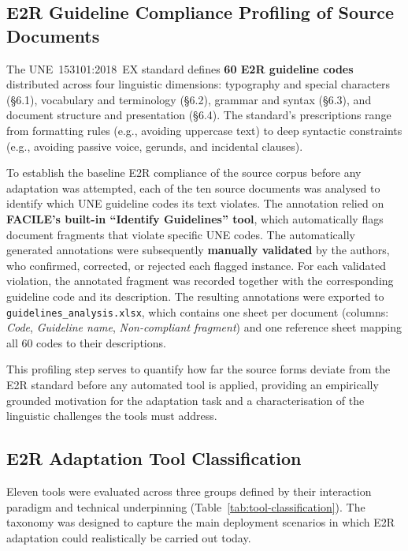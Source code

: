 \documentclass[12pt, a4paper]{article}
\begin{document}
\subsection{E2R Guideline Compliance Profiling of Source Documents}
\label{ssec:profiling}

The UNE~153101:2018~EX standard defines \textbf{60 E2R guideline codes} distributed
across four linguistic dimensions: typography and special characters (\S6.1), vocabulary
and terminology (\S6.2), grammar and syntax (\S6.3), and document structure and
presentation (\S6.4). The standard's prescriptions range from formatting rules (e.g.,
avoiding uppercase text) to deep syntactic constraints (e.g., avoiding passive voice,
gerunds, and incidental clauses).

To establish the baseline E2R compliance of the source corpus before any adaptation was
attempted, each of the ten source documents was analysed to identify which UNE guideline
codes its text violates. The annotation relied on \textbf{FACILE's built-in
``Identify Guidelines'' tool}, which automatically flags document fragments that violate
specific UNE codes. The automatically generated annotations were subsequently
\textbf{manually validated} by the authors, who confirmed, corrected, or rejected each
flagged instance. For each validated violation, the annotated fragment was recorded
together with the corresponding guideline code and its description. The resulting
annotations were exported to \texttt{guidelines\_analysis.xlsx}, which contains one sheet
per document (columns: \textit{Code}, \textit{Guideline name}, \textit{Non-compliant
fragment}) and one reference sheet mapping all 60 codes to their descriptions.

This profiling step serves to quantify how far the source forms deviate from the E2R
standard before any automated tool is applied, providing an empirically grounded
motivation for the adaptation task and a characterisation of the linguistic challenges
the tools must address.

\subsection{E2R Adaptation Tool Classification}
\label{ssec:tools}

Eleven tools were evaluated across three groups defined by their interaction paradigm
and technical underpinning (Table~\ref{tab:tool-classification}). The taxonomy was
designed to capture the main deployment scenarios in which E2R adaptation could
realistically be carried out today.
\end{document}
